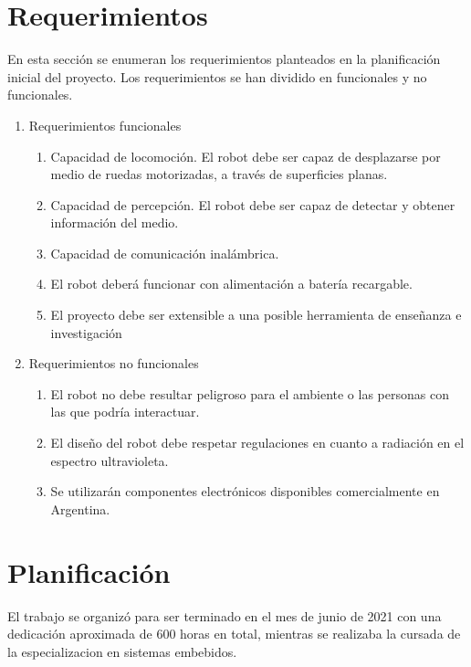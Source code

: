 \section{Requerimientos}

En esta sección se enumeran los requerimientos planteados en la planificación inicial del proyecto.  Los  requerimientos se han dividido en funcionales y no funcionales.

\label{sec:requerimientos}

\begin{enumerate}
\item Requerimientos funcionales
	\begin{enumerate}
	\item Capacidad de locomoción.  El robot debe ser capaz de desplazarse por medio de ruedas motorizadas, a través de superficies planas.
	\item Capacidad de percepción. El robot debe ser capaz de detectar y obtener información del medio. 
	\item Capacidad de comunicación inalámbrica.
	\item El robot deberá funcionar con alimentación a batería recargable.
	\item El proyecto debe ser extensible a una posible herramienta de enseñanza e investigación

	\end{enumerate}
\item Requerimientos no funcionales
	\begin{enumerate}
	\item El robot no debe resultar peligroso para el ambiente o las personas con las que podría interactuar.
	\item El diseño del robot debe respetar regulaciones en cuanto a radiación en el espectro ultravioleta.
	\item Se utilizarán componentes electrónicos disponibles comercialmente en Argentina.
	\end{enumerate}
\end{enumerate}

\section{Planificación}

El trabajo se organizó para ser terminado en el mes de junio de 2021 con una dedicación aproximada de 600 horas en total, mientras se realizaba la cursada de la especializacion en sistemas embebidos.

